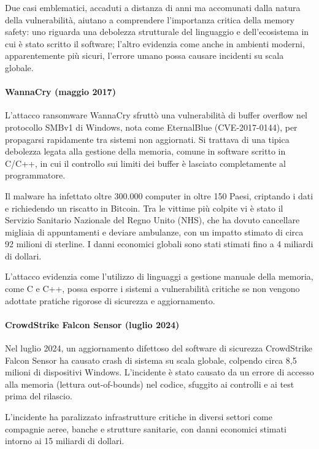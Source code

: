 \bigskip
\noindent
Due casi emblematici, accaduti a distanza di anni ma accomunati dalla natura
della vulnerabilità, aiutano a comprendere l'importanza critica della memory safety:
uno riguarda una debolezza strutturale del linguaggio e dell'ecosistema in cui è
stato scritto il software; l'altro evidenzia come anche in ambienti moderni,
apparentemente più sicuri, l'errore umano possa causare incidenti su scala globale.

\paragraph{WannaCry (maggio 2017)}

L'attacco ransomware WannaCry sfruttò una vulnerabilità di buffer overflow nel protocollo
SMBv1 di Windows, nota come EternalBlue (CVE-2017-0144), per propagarsi rapidamente
tra sistemi non aggiornati. Si trattava di una tipica debolezza legata alla
gestione della memoria, comune in software scritto in C/C++, in cui il controllo
sui limiti dei buffer è lasciato completamente al programmatore.

Il malware ha infettato oltre 300.000 computer in oltre 150 Paesi, criptando i dati
e richiedendo un riscatto in Bitcoin. Tra le vittime più colpite vi è stato il
Servizio Sanitario Nazionale del Regno Unito (NHS), che ha dovuto cancellare migliaia
di appuntamenti e deviare ambulanze, con un impatto stimato di circa 92 milioni
di sterline. I danni economici globali sono stati stimati fino a 4 miliardi di dollari.\cite{wannacry_kaspersky}

L'attacco evidenzia come l'utilizzo di linguaggi a gestione manuale della
memoria, come C e C++, possa esporre i sistemi a vulnerabilità critiche se non
vengono adottate pratiche rigorose di sicurezza e aggiornamento.

\paragraph{CrowdStrike Falcon Sensor (luglio 2024)}

Nel luglio 2024, un aggiornamento difettoso del software di sicurezza
CrowdStrike Falcon Sensor ha causato crash di sistema su scala globale, colpendo
circa 8,5 milioni di dispositivi Windows. L'incidente è stato causato da un
errore di accesso alla memoria (lettura out-of-bounds) nel codice, sfuggito ai controlli
e ai test prima del rilascio.

L'incidente ha paralizzato infrastrutture critiche in diversi settori come compagnie
aeree, banche e strutture sanitarie, con danni economici stimati intorno ai 15 miliardi
di dollari.\cite{crowdstrike_bug_wired}\cite{crowdstrike_bug_wired_cost}

